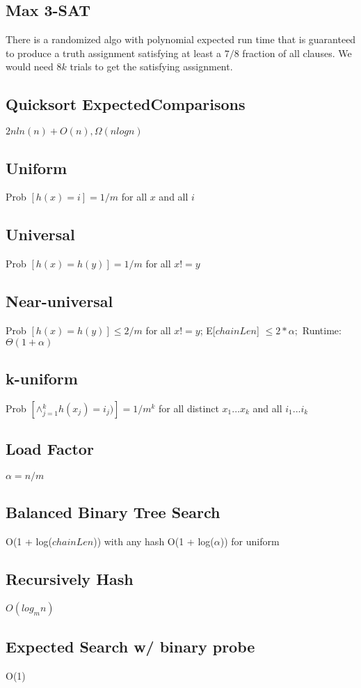 \subsection{Max 3-SAT}
There is a randomized algo with polynomial expected run time that is guaranteed to produce a truth assignment satisfying at least a $7/8$ fraction of all clauses. We would need $8k$ trials to get the satisfying assignment.

\begin{algorithmic}[1]
		\EndFor
		\Else
		\EndIf
	\EndFunction
\end{algorithmic}


\subsection{Quicksort ExpectedComparisons}
$2nln(n) + O(n), \Omega(nlogn)$


\subsection{Uniform}

Prob $[h(x) = i] = 1/m$ for all $x$ and all $i$

\subsection{Universal}
Prob $[h(x) = h(y)] = 1/m$ for all $x != y$
\subsection{Near-universal}
Prob $[h(x) = h(y)] \leq 2/m$ for all $x != y$; E[$chainLen$] $\leq 2*\alpha;$ Runtime: $\Theta(1 + \alpha)$
\subsection{k-uniform}
Prob $ [ \wedge{}_{j=1}^{k} h(x_j) = i_j) ] = 1 / m^{k}$ for all distinct $x_1...x_k$ and all $i_1...i_k$
\subsection{Load Factor}
$\alpha = n/m$
\subsection{Balanced Binary Tree Search}
O(1 + log($chainLen$)) with any hash 
O(1 + log($\alpha$)) for uniform
\subsection{Recursively Hash}
$O(log_{m}{n})$
\subsection{Expected Search w/ binary probe}
O(1)